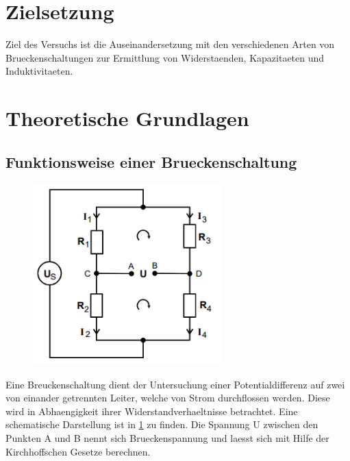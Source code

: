 \section{Zielsetzung}
Ziel des Versuchs ist die Auseinandersetzung mit den verschiedenen Arten von Brueckenschaltungen zur Ermittlung von Widerstaenden, Kapazitaeten und Induktivitaeten.
\section{Theoretische Grundlagen}
\subsection{Funktionsweise einer Brueckenschaltung}
\begin{figure}[H]
    \centering
    \captionsetup{justification=centering}
    \includegraphics[height=7cm]{"Schema_Brueckenschaltung.png"}
    \label{Fig:Schema}
\end{figure}
Eine Breuckenschaltung dient der Untersuchung einer Potentialdifferenz auf zwei von einander getrennten Leiter, welche von Strom durchflossen werden. Diese wird in Abhaengigkeit ihrer Widerstandverhaeltnisse betrachtet. Eine schematische Darstellung ist in \ref{Fig:Schema} zu finden. 
Die Spannung U zwischen den Punkten A und B nennt sich Brueckenspannung und laesst sich mit Hilfe der Kirchhoffschen Gesetze berechnen.
